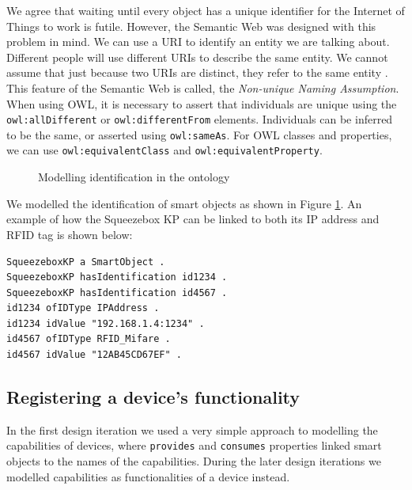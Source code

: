 We agree that waiting until every object has a unique identifier for the Internet of Things to work is futile. However, the Semantic Web was designed with this problem in mind. We can use a \ac{URI} to identify an entity we are talking about. Different people will use different \acp{URI} to describe the same entity. We cannot assume that just because two \acp{URI} are distinct, they refer to the same entity \cite{Allemang2011}. This feature of the Semantic Web is called, the \emph{Non-unique Naming Assumption}. When using \ac{OWL}, it is necessary to assert that individuals are unique using the \texttt{owl:allDifferent} or \texttt{owl:differentFrom} elements. Individuals can be inferred to be the same, or asserted using \texttt{owl:sameAs}. For \ac{OWL} classes and properties, we can use \texttt{owl:equivalentClass} and \texttt{owl:equivalentProperty}.

\begin{figure}[bth]
	\begin{center}
	\end{center}
	\caption{Modelling identification in the ontology}
	\label{identification}
\end{figure}

We modelled the identification of smart objects as shown in Figure \ref{identification}. An example of how the Squeezebox \ac{KP} can be linked to both its IP address and \ac{RFID} tag is shown below:

\begin{verbatim}
SqueezeboxKP a SmartObject .
SqueezeboxKP hasIdentification id1234 .
SqueezeboxKP hasIdentification id4567 .
id1234 ofIDType IPAddress .
id1234 idValue "192.168.1.4:1234" .
id4567 ofIDType RFID_Mifare .
id4567 idValue "12AB45CD67EF" .
\end{verbatim}

\subsection{Registering a device's functionality}

In the first design iteration we used a very simple approach to modelling the capabilities of devices, where \texttt{provides} and \texttt{consumes} properties linked smart objects to the names of the capabilities. During the later design iterations we modelled capabilities as functionalities of a device instead.

